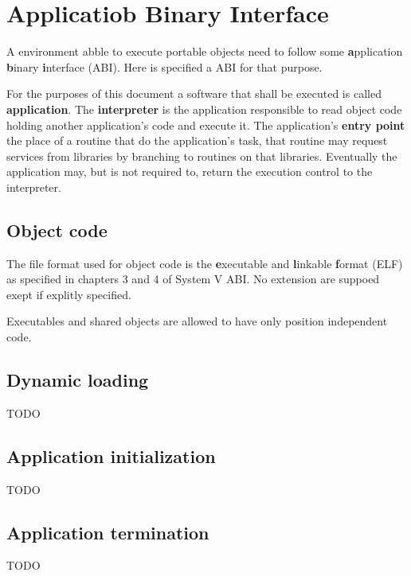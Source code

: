 \section{Applicatiob Binary Interface}

A environment abble to execute portable objects need to follow some
\textbf{a}pplication \textbf{b}inary \textbf{i}nterface (ABI).
Here is specified a ABI for that purpose.

For the purposes of this document
a software that shall be executed is called \textbf{application}.
The \textbf{interpreter} is the application responsible to read object code
holding another application's code and execute it.
The application's \textbf{entry point} the place of a routine
that do the application's task,
that routine may request services from libraries by branching
to routines on that libraries.
Eventually the application may, but is not required to,
return the execution control to the interpreter.

\subsection{Object code}

The file format used for object code is the
\textbf{e}xecutable and \textbf{l}inkable \textbf{f}ormat (ELF)
as specified in chapters 3 and 4 of System V ABI\cite{sysv}.
No extension are suppoed exept if explitly specified.

Executables and shared objects
are allowed to have only position independent code.

\subsection{Dynamic loading}

TODO

\subsection{Application initialization}

TODO

\subsection{Application termination}

TODO
